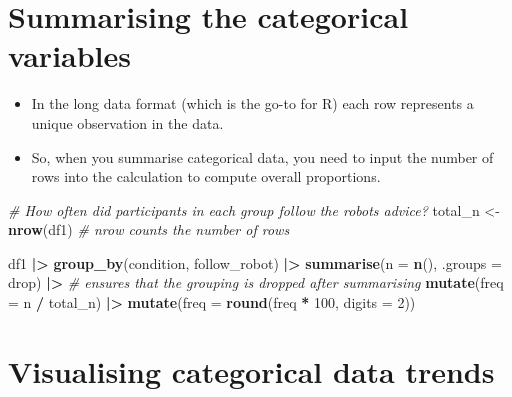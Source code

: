 \documentclass[
]{article}
\newenvironment{Shaded}{\begin{snugshade}}{\end{snugshade}}
\newcommand{\AttributeTok}[1]{\textcolor[rgb]{0.13,0.29,0.53}{#1}}
\newcommand{\CommentTok}[1]{\textcolor[rgb]{0.56,0.35,0.01}{\textit{#1}}}
\newcommand{\DecValTok}[1]{\textcolor[rgb]{0.00,0.00,0.81}{#1}}
\newcommand{\FunctionTok}[1]{\textcolor[rgb]{0.13,0.29,0.53}{\textbf{#1}}}
\newcommand{\NormalTok}[1]{#1}
\newcommand{\OtherTok}[1]{\textcolor[rgb]{0.56,0.35,0.01}{#1}}
\newcommand{\SpecialCharTok}[1]{\textcolor[rgb]{0.81,0.36,0.00}{\textbf{#1}}}
\newcommand{\StringTok}[1]{\textcolor[rgb]{0.31,0.60,0.02}{#1}}
\providecommand{\tightlist}{%
  \setlength{\itemsep}{0pt}\setlength{\parskip}{0pt}}
\begin{document}
\hypertarget{summarising-the-categorical-variables}{%
\section{Summarising the categorical
variables}\label{summarising-the-categorical-variables}}

\begin{itemize}
\tightlist
\item
  In the long data format (which is the go-to for R) each row represents
  a unique observation in the data.
\item
  So, when you summarise categorical data, you need to input the number
  of rows into the calculation to compute overall proportions.
\end{itemize}

\begin{Shaded}
\begin{Highlighting}[]
\CommentTok{\# How often did participants in each group follow the robots advice?}
\NormalTok{total\_n }\OtherTok{\textless{}{-}} 
  \FunctionTok{nrow}\NormalTok{(df1) }\CommentTok{\# nrow counts the number of rows}

\NormalTok{df1 }\SpecialCharTok{|\textgreater{}}
  \FunctionTok{group\_by}\NormalTok{(condition, follow\_robot) }\SpecialCharTok{|\textgreater{}}
  \FunctionTok{summarise}\NormalTok{(}\AttributeTok{n =} \FunctionTok{n}\NormalTok{(), }
            \AttributeTok{.groups =} \StringTok{\textquotesingle{}drop\textquotesingle{}}\NormalTok{) }\SpecialCharTok{|\textgreater{}} \CommentTok{\# ensures that the grouping is dropped after summarising}
  \FunctionTok{mutate}\NormalTok{(}\AttributeTok{freq =}\NormalTok{ n }\SpecialCharTok{/}\NormalTok{ total\_n) }\SpecialCharTok{|\textgreater{}}
  \FunctionTok{mutate}\NormalTok{(}\AttributeTok{freq =} \FunctionTok{round}\NormalTok{(freq }\SpecialCharTok{*} \DecValTok{100}\NormalTok{, }\AttributeTok{digits =} \DecValTok{2}\NormalTok{))}
\end{Highlighting}
\end{Shaded}

\hypertarget{visualising-categorical-data-trends}{%
\section{Visualising categorical data
trends}\label{visualising-categorical-data-trends}}
\end{document}

